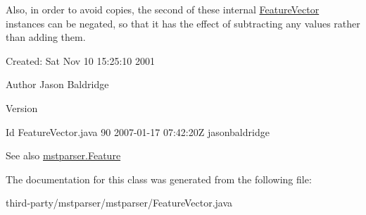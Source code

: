Also, in order to avoid copies, the second of these internal {\ttfamily \hyperlink{classmstparser_1_1FeatureVector}{FeatureVector}} instances can be negated, so that it has the effect of subtracting any values rather than adding them.

Created: Sat Nov 10 15:25:10 2001 

\begin{DoxyAuthor}{Author}
Jason Baldridge 
\end{DoxyAuthor}
\begin{DoxyVersion}{Version}

\end{DoxyVersion}
\begin{DoxyParagraph}{Id}
FeatureVector.java 90 2007-\/01-\/17 07:42:20Z jasonbaldridge 
\end{DoxyParagraph}
\begin{DoxySeeAlso}{See also}
\hyperlink{classmstparser_1_1Feature}{mstparser.Feature} 
\end{DoxySeeAlso}


The documentation for this class was generated from the following file:\begin{DoxyCompactItemize}
\item 
third-\/party/mstparser/mstparser/FeatureVector.java\end{DoxyCompactItemize}
